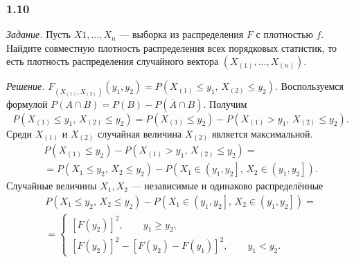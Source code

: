 \subsubsection{1.10}

\textit{Задание.} Пусть $X1, \dotsc, X_n$ --- выборка из распределения $F$ с плотностью $f$.
Найдите совместную плотность распределения всех порядковых статистик,
то есть плотность распределения случайного вектора
$ \left( X_{ \left( 1 \right) }, \dotsc, X_{ \left( n \right) } \right) $.

\textit{Решение.}
$F_{ \left( X_{ \left( 1 \right) }, X_{ \left( 2 \right) } \right) } \left( y_1, y_2 \right) =
  P \left( X_{ \left( 1 \right) } \leq y_1, \, X_{ \left( 2 \right) } \leq y_2 \right)$.
Воспользуемся формулой
$P \left( A \cap B \right) =
  P \left( B \right) - P \left( \overline{A} \cap B \right) $.
Получим
$$P \left( X_{ \left( 1 \right) } \leq y_1, \, X_{ \left( 2 \right) } \leq y_2 \right) =
  P \left( X_{ \left( 1 \right) } \leq y_2 \right) -
  P \left( X_{ \left( 1 \right) } > y_1, \, X_{ \left( 2 \right) } \leq y_2 \right).$$
Среди $X_{ \left( 1 \right) }$ и $X_{ \left( 2 \right) }$ случайная величина
$X_{ \left( 2 \right) }$ является максимальной.
\begin{equation*}
  \begin{split}
    P \left( X_{ \left( 1 \right) } \leq y_2 \right) -
    P \left( X_{ \left( 1 \right) } > y_1, \, X_{ \left( 2 \right) } \leq y_2 \right) = \\
    = P \left( X_1 \leq y_2, \, X_2 \leq y_2 \right) -
    P \left( X_1 \in \left( y_1, y_2 \right], \, X_2 \in \left( y_1, y_2 \right] \right).
  \end{split}
\end{equation*}
Случайные величины $X_1, X_2$ --- независимые и одинаково распределённые
\begin{equation*}
  \begin{split}
    P \left( X_1 \leq y_2, \, X_2 \leq y_2 \right) -
    P \left( X_1 \in \left( y_1, y_2 \right], \, X_2 \in \left( y_1, y_2 \right] \right) = \\
    = \begin{cases}
      \left[ F \left( y_2 \right) \right]^2, \qquad y_1 \geq y_2, \\
      \left[ F \left( y_2 \right) \right]^2 -
      \left[ F \left( y_2 \right) - F \left( y_1 \right) \right]^2, \qquad y_1 < y_2.
    \end{cases}
\end{split}
\end{equation*}


